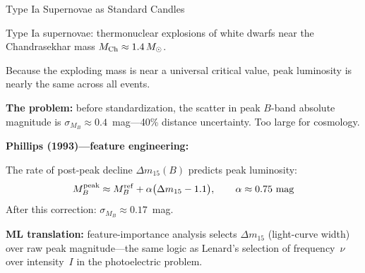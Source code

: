 \documentclass[aspectratio=169]{beamer}
\begin{document}
\begin{frame}{Type Ia Supernovae as Standard Candles}

Type Ia supernovae: thermonuclear explosions of white dwarfs near the
Chandrasekhar mass $M_{\rm Ch} \approx 1.4\,M_\odot$.

\medskip
Because the exploding mass is near a universal critical value, peak
luminosity is nearly the same across all events.

\medskip
\textbf{The problem:} before standardization, the scatter in peak $B$-band
absolute magnitude is $\sigma_{M_B} \approx 0.4$~mag---40\% distance
uncertainty.  Too large for cosmology.

\bigskip
\textbf{Phillips (1993)---feature engineering:}

The rate of post-peak decline $\Delta m_{15}(B)$ predicts peak luminosity:
\[
  M_B^{\rm peak} \approx M_B^{\rm ref} + \alpha\bigl(\Delta m_{15} - 1.1\bigr),
  \qquad \alpha \approx 0.75~\text{mag}
\]
After this correction: $\sigma_{M_B} \approx 0.17$~mag.

\medskip
\textbf{ML translation:} feature-importance analysis selects $\Delta m_{15}$
(light-curve width) over raw peak magnitude---the same logic as
Lenard's selection of frequency~$\nu$ over intensity~$I$ in the
photoelectric problem.

\end{frame}
\end{document}
